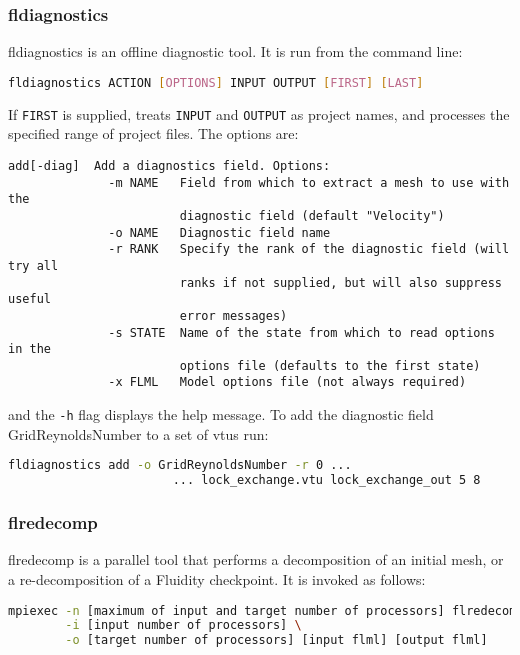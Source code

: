 \subsubsection{fldiagnostics}
\label{sec:fldiagnostics}
fldiagnostics is an offline diagnostic tool. It is run from the command line:

\begin{lstlisting}[language = Bash]
fldiagnostics ACTION [OPTIONS] INPUT OUTPUT [FIRST] [LAST]
\end{lstlisting}

If \lstinline[language = Bash]+FIRST+ is supplied, treats \lstinline[language = Bash]+INPUT+ and \lstinline[language = Bash]+OUTPUT+ as project names, and processes the specified range of project files. The options are:
\begin{lstlisting}
add[-diag]  Add a diagnostics field. Options:
              -m NAME   Field from which to extract a mesh to use with the
                        diagnostic field (default "Velocity")
              -o NAME   Diagnostic field name
              -r RANK   Specify the rank of the diagnostic field (will try all
                        ranks if not supplied, but will also suppress useful
                        error messages)
              -s STATE  Name of the state from which to read options in the 
                        options file (defaults to the first state)
              -x FLML   Model options file (not always required)
\end{lstlisting}

and the \lstinline[language = Bash]+-h+ flag displays the help message. To add the diagnostic field GridReynoldsNumber to a set of vtus run:

\begin{lstlisting}[language = Bash]
fldiagnostics add -o GridReynoldsNumber -r 0 ...
			           ... lock_exchange.vtu lock_exchange_out 5 8
\end{lstlisting}


\subsubsection{flredecomp}
\label{sec:flredecomp}
flredecomp is a parallel tool that performs a decomposition of an initial mesh, or a re-decomposition of a Fluidity checkpoint.
It is invoked as follows:
\begin{lstlisting}[language=bash]
mpiexec -n [maximum of input and target number of processors] flredecomp \
        -i [input number of processors] \
        -o [target number of processors] [input flml] [output flml]
\end{lstlisting}

